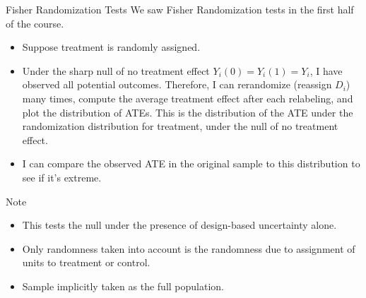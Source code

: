 \documentclass[aspectratio=169, handout]{beamer}
\begin{document}
{\footnotesize
\begin{frame}{Fisher Randomization Tests}
We saw Fisher Randomization tests in the first half of the course.
\begin{itemize}
  \item Suppose treatment is randomly assigned.
  \item Under the sharp null of no treatment effect $Y_i(0)=Y_i(1)=Y_i$,
    I have observed all potential outcomes.
    Therefore, I can rerandomize (reassign $D_i$) many times, compute
    the average treatment effect after each relabeling, and plot the
    distribution of ATEs.
    This is the distribution of the ATE under the randomization
    distribution for treatment, under the null of no treatment effect.
  \item I can compare the observed ATE in the original sample to this
    distribution to see if it's extreme.
\end{itemize}
Note
\begin{itemize}
  \item This tests the null under the presence of design-based
    uncertainty alone.
  \item Only randomness taken into account is the randomness due to
    assignment of units to treatment or control.
  \item Sample implicitly taken as the full population.
\end{itemize}
\end{frame}
}
\end{document}

